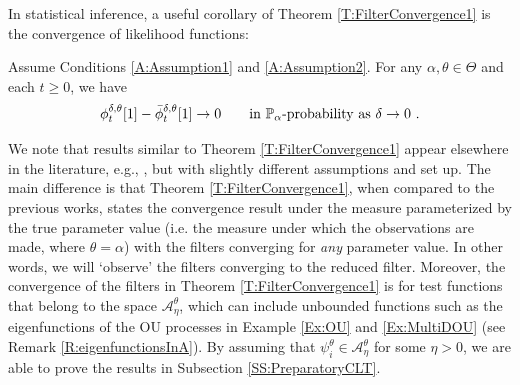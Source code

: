 \documentclass{article}
\begin{document}
In statistical inference, a useful corollary of Theorem \ref{T:FilterConvergence1} is the convergence of likelihood functions:
\begin{corollary}\label{Lemma:likelihoodConvergence}Assume  Conditions \ref{A:Assumption1} and \ref{A:Assumption2}. For any $\alpha,\theta\in\Theta$ and each $t\geq0$, we have
\[\phi_t^{\delta,\theta}[1]- \bar\phi_t^{\delta,\theta}[1]\rightarrow 0 \qquad\hbox{in  } \mathbb{P}_{\alpha}\hbox{-probability as }\delta\rightarrow 0\ .\]
\end{corollary}


We note that results similar to Theorem \ref{T:FilterConvergence1} appear elsewhere in the literature, e.g., \cite{KleptsinaLiptserSerebrovski1997,Ichihara2004, ParkSriSowers2008, ParkRozovskySowers2010,ParkSriSowers2011,ImkellerSriPerkowskiYeong2012}, but with slightly different assumptions and set up. The main difference is that Theorem \ref{T:FilterConvergence1}, when compared to the previous works, states the convergence result under the measure parameterized by the true parameter value (i.e. the measure under which the observations are made, where $\theta=\alpha$) with the filters converging for \textit{any} parameter value. In other words, we will `observe' the
filters converging to the reduced filter. Moreover, the convergence of the filters in Theorem \ref{T:FilterConvergence1} is for test functions that belong to the space $\mathcal{A}_{\eta}^{\theta}$, which can include unbounded functions such as the eigenfunctions of the OU processes in Example \ref{Ex:OU} and \ref{Ex:MultiDOU} (see Remark \ref{R:eigenfunctionsInA}). By assuming that $\psi_i^\theta\in\mathcal A_\eta^\theta$ for some $\eta>0$, we are able to prove the results in Subsection \ref{SS:PreparatoryCLT}.







\end{document}
